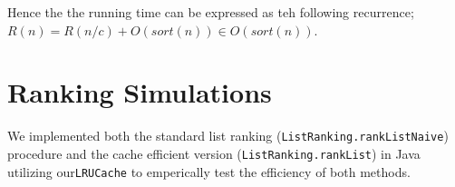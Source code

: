 \documentclass[11pt]{article}
\begin{document}
Hence the the running time can be expressed as teh following recurrence; $R(n) = R(n/c) + O(sort(n)) \in O(sort(n))$.

\section{Ranking Simulations}

We implemented both the standard list ranking (\texttt{ListRanking.rankListNaive}) procedure and the cache efficient version
 (\texttt{ListRanking.rankList}) in Java utilizing our\texttt{LRUCache} to emperically test the 
efficiency of  both methods.
\end{document}
